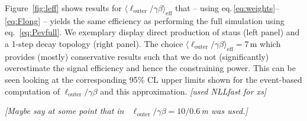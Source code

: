 \documentclass[preprint,number,sort&compress,twocolumn,3p]{elsstyarticle}
\newcommand{\com}[1]{\emph{\color{red}[#1]}}  %
\begin{document}
\begin{appendix}
Figure~\ref{fig:leff} shows results for $\langle\ell_\text{outer}/\gamma\beta\rangle_\text{eff}$ that -- using eq.\,\eqref{eq:weights}--\eqref{eq:Flong} --
yields the same efficiency as performing the full simulation using eq.~\eqref{eq:Pevfull}. We exemplary display 
direct production of staus (left panel) and a 1-step decay topology (right panel). The 
choice $\langle\ell_\text{outer}/\gamma\beta\rangle_\text{eff}=7\,$m
which provides (mostly) conservative results such that we do not
(significantly) overestimate the signal efficiency and hence the constraining power.
This can be seen looking at the corresponding 
95\% CL upper limits shown for the event-based computation of $\ell_\text{outer}/\gamma\beta$ and this approximation.
\com{used NLLfast for xs}

\com{Maybe say at some point that in~\cite{Heisig:2015yla} $\ell_\text{outer}/\gamma\beta = 10/0.6\,$m was used.}










\end{appendix}
\end{document}
